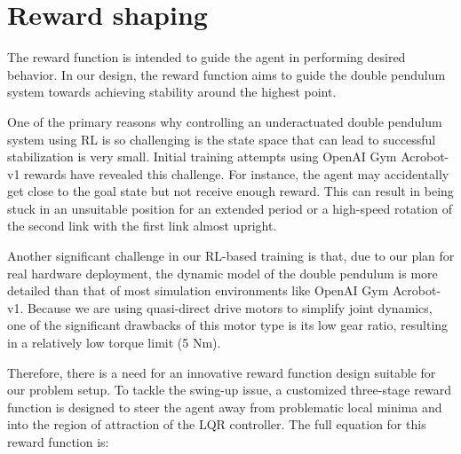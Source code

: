 \section{Reward shaping}
The reward function is intended to guide the agent in performing desired behavior. In our design, the reward function aims to guide the double pendulum system towards achieving stability around the highest point.

One of the primary reasons why controlling an underactuated double pendulum system using RL is so challenging is the state space that can lead to successful stabilization is very small. Initial training attempts using OpenAI Gym Acrobot-v1\cite{towers_gymnasium_2023} rewards have revealed this challenge. For instance, the agent may accidentally get close to the goal state but not receive enough reward. This can result in being stuck in an unsuitable position for an extended period or a high-speed rotation of the second link with the first link almost upright. 

Another significant challenge in our RL-based training is that, due to our plan for real hardware deployment, the dynamic model of the double pendulum is more detailed than that of most simulation environments like OpenAI Gym Acrobot-v1\cite{towers_gymnasium_2023}. Because we are using quasi-direct drive motors to simplify joint dynamics, one of the significant drawbacks of this motor type is its low gear ratio, resulting in a relatively low torque limit (5 Nm).

Therefore, there is a need for an innovative reward function design suitable for our problem setup. To tackle the swing-up issue, a customized three-stage reward function is designed to steer the agent away from problematic local minima and into the region of attraction of the LQR controller. The full equation for this reward function is:

